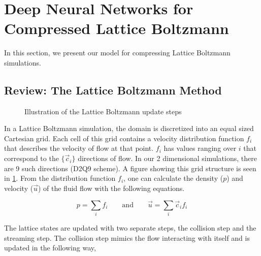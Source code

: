 \documentclass{article}
\begin{document}
\section{Deep Neural Networks for Compressed Lattice Boltzmann}

In this section, we present our model for compressing Lattice Boltzmann simulations.

\subsection{Review: The Lattice Boltzmann Method}

\begin{figure}[!t]
\centering
{}
\caption{Illustration of the Lattice Boltzmann update steps}
\label{lattice_boltzmann}
\end{figure}

In a Lattice Boltzmann simulation, the domain is discretized into an equal sized Cartesian grid. Each cell of this grid contains a velocity distribution function $f_i$ that describes the velocity of flow at that point. $f_i$ has values ranging over $i$ that correspond to the $\{ \vec{c}_i \}$ directions of flow. In our 2 dimensional simulations, there are 9 such directions (D2Q9 scheme). A figure showing this grid structure is seen in \ref{lattice_boltzmann}. From the distribution function $f_i$, one can calculate the density ($p$) and velocity ($\vec{u}$) of the fluid flow with the following equations.

\begin{equation}
  p = \sum_i f_i  \qquad\text{and}\qquad \vec{u} = \sum_i \vec{c}_i f_i 
\end{equation}

The lattice states are updated with two separate steps, the collision step and the streaming step. The collision step mimics the flow interacting with itself and is updated in the following way,
\end{document}
